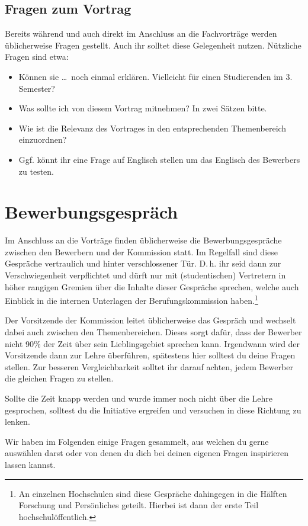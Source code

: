\documentclass[10pt,twoside,a5paper,openright]{book}
\begin{document}
\subsection{Fragen zum Vortrag}
Bereits während und auch direkt im Anschluss an die Fachvorträge werden üblicherweise Fragen gestellt. Auch ihr solltet diese Gelegenheit nutzen. Nützliche Fragen sind etwa:
\begin{itemize}
	\item Können sie \dots\ noch einmal erklären. Vielleicht für einen Studierenden im 3. Semester?
	\item Was sollte ich von diesem Vortrag mitnehmen? In zwei Sätzen bitte.
	\item Wie ist die Relevanz des Vortrages in den entsprechenden Themenbereich einzuordnen?
	\item Ggf. könnt ihr eine Frage auf Englisch stellen um das Englisch des Bewerbers zu testen.
\end{itemize}


\section{Bewerbungsgespräch}
Im Anschluss an die Vorträge finden üblicherweise die Bewerbungsgespräche zwischen den Bewerbern und der Kommission statt. Im Regelfall sind diese Gespräche vertraulich und hinter verschlossener Tür. D.\,h. ihr seid dann zur Verschwiegenheit verpflichtet und dürft nur mit (studentischen) Vertretern in höher rangigen Gremien über die Inhalte dieser Gespräche sprechen, welche auch Einblick in die internen Unterlagen der Berufungskommission haben.\footnote{An einzelnen Hochschulen sind diese Gespräche dahingegen in die Hälften Forschung und Persönliches geteilt. Hierbei ist dann der erste Teil hochschulöffentlich.}

Der Vorsitzende der Kommission leitet üblicherweise das Gespräch und wechselt dabei auch zwischen den Themenbereichen. Dieses sorgt dafür, dass der Bewerber nicht 90\% der Zeit über sein Lieblingsgebiet sprechen kann. Irgendwann wird der Vorsitzende dann zur Lehre überführen, spätestens hier solltest du deine Fragen stellen. Zur besseren Vergleichbarkeit solltet ihr darauf achten, jedem Bewerber die gleichen Fragen zu stellen. 

Sollte die Zeit knapp werden und wurde immer noch nicht über die Lehre gesprochen, solltest du die Initiative ergreifen und versuchen in diese Richtung zu lenken.

Wir haben im Folgenden einige Fragen gesammelt, aus welchen du gerne auswählen darst oder von denen du dich bei deinen eigenen Fragen inspirieren lassen kannst.
\end{document}
